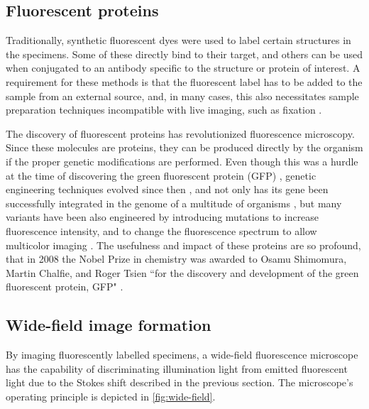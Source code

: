 

  \subsection{Fluorescent proteins}
    Traditionally, synthetic fluorescent dyes were used to label certain structures in the specimens. Some of these directly bind to their target,
    and others can be used when conjugated to an antibody specific to the structure or protein of interest. A requirement for these methods is that the fluorescent label has to be added to the sample from an external source, and, in many cases, this also necessitates sample preparation techniques incompatible with live imaging, such as fixation \cite{bacallao_guiding_1990}.

    The discovery of fluorescent proteins has revolutionized fluorescence microscopy. Since these molecules are proteins, they can be produced directly by the organism if the proper genetic modifications are performed. Even though this was a hurdle at the time of discovering the green fluorescent protein (GFP) \cite{shimomura_extraction_1962}, genetic engineering techniques evolved since then \cite{prasher_primary_1992}, and not only has its gene been successfully integrated in the genome of a multitude of organisms \cite{chalfie_green_1994,amsterdam_aequorea_1995,okabe_green_1997}, but many variants have been also engineered by introducing mutations to increase fluorescence intensity, and to change the fluorescence spectrum to allow multicolor imaging \cite{heim_wavelength_1994,heim_engineering_1996,cormack_facs-optimized_1996,okabe_green_1997}. The usefulness and impact of these proteins are so profound, that in 2008 the Nobel Prize in chemistry was awarded to Osamu Shimomura, Martin Chalfie, and Roger Tsien ``for the discovery and development of the green fluorescent protein, GFP" \cite{service_three_2008}.


  \subsection{Wide-field image formation}
    By imaging fluorescently labelled specimens, a wide-field fluorescence microscope has the capability of discriminating illumination light from emitted fluorescent light due to the Stokes shift described in the previous section. The microscope's operating principle is depicted in \autoref{fig:wide-field}.

